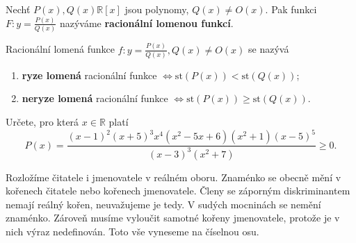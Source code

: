 \begin{definition}
    Nechť $P(x), Q(x) \mathbb R[x]$ jsou polynomy, $Q(x) \ne O(x).$
    Pak funkci $F:y=\frac{P(x)}{Q(x)}$ nazýváme \textbf{racionální
    lomenou funkcí}.
\end{definition}

\begin{definition}
    Racionální lomená funkce $f: y=\frac{P(x)}{Q(x)}, Q(x) \ne O(x)$
    se nazývá
    \begin{enumerate}[$i.$]
        \item \textbf{ryze lomená} racionální funkce
        $\iff \text{st}\left (P(x) \right ) <
        \text{st}\left (Q(x) \right )$;
       	\item \textbf{neryze lomená} racionální funkce
        $\iff \text{st}\left (P(x) \right ) \geq
        \text{st}\left (Q(x) \right )$.
    \end{enumerate}
\end{definition}

\begin{priklad}
  Určete, pro která $x \in \mathbb R$ platí
  $$P(x) = \frac{(x-1)^2(x+5)^3x^4(x^2-5x+6)(x^2+1)(x-5)^5}{(x-3)^3(x^2+7)} \geq 0.$$
\end{priklad}

\begin{reseni}
  Rozložíme čitatele i jmenovatele v reálném oboru. Znaménko se obecně mění v kořenech čitatele nebo kořenech jmenovatele. Členy se záporným diskriminantem nemají reálný kořen,
  neuvažujeme je tedy. V sudých mocninách se nemění znaménko. Zároveň musíme vyloučit samotné kořeny jmenovatele, protože je v nich výraz nedefinován. Toto vše vyneseme na číselnou osu.
\end{reseni}

